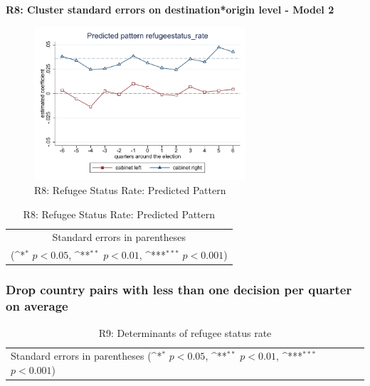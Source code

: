 \documentclass[10pt,a4paper]{scrartcl}
\begin{document}
\clearpage
\textbf{R8: Cluster standard errors on destination*origin level - Model 2}
\begin{figure}[!ht]
	\centering
	\includegraphics[width=0.7\textwidth]{figures_edited/refugeestatus_rate_graph2_R8.pdf}
	\caption{R8: Refugee Status Rate: Predicted Pattern}
\end{figure}

\begin{table}[!ht]\centering
	\footnotesize
	\renewcommand{\arraystretch}{1.2}
	\def\sym#1{\ifmmode^{#1}\else\(^{#1}\)\fi}
	\caption{R8: Refugee Status Rate: Predicted Pattern}
	\begin{tabular}{l*{2}{c}}
		\hline\hline
		
		\hline\hline
		\multicolumn{3}{c}{\footnotesize Standard errors in parentheses} \\
		\multicolumn{3}{c}{\footnotesize (\sym{*} \(p<0.05\), \sym{**} \(p<0.01\), \sym{***} \(p<0.001\))} \\
	\end{tabular}
\end{table}





\clearpage
\FloatBarrier
\subsubsection{Drop country pairs with less than one decision per quarter on average}
\begin{table}[!ht]\centering
	\renewcommand{\arraystretch}{1.25}
	\small
	\def\sym#1{\ifmmode^{#1}\else\(^{#1}\)\fi}
	\caption{R9: Determinants of refugee status rate}
	\begin{tabular}{l*{3}{c}}
		\hline\hline
		
		\hline\hline
		\multicolumn{4}{l}{\footnotesize Standard errors in parentheses (\sym{*} \(p<0.05\), \sym{**} \(p<0.01\), \sym{***} \(p<0.001\))}\\
	\end{tabular}
\end{table}
\end{document}
